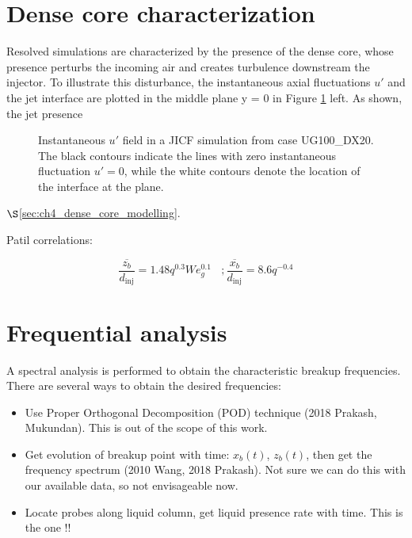 \section{Dense core characterization}
\label{subsec:ch5_dense_core_in_ACLS_simus}

Resolved simulations are characterized by the presence of the dense core, whose presence perturbs the incoming air and creates turbulence downstream the injector. To illustrate this disturbance, the instantaneous axial fluctuations $u'$ and the jet interface are plotted in the middle plane y = 0 in Figure \ref{fig:results_dense_core_modeling_up_field} left. As shown, the jet presence

\begin{figure}[ht]
\centering
{}
\caption[Perturbation effect of the liquid dense core in the gaseous field.]{Instantaneous $u'$ field in a JICF simulation from case UG100\_DX20. The black contours indicate the lines with zero instantaneous fluctuation $u' = 0$, while the white contours denote the location of the interface at the plane.}
\label{fig:results_dense_core_modeling_up_field}
\end{figure}



$\S$\ref{sec:ch4_dense_core_modelling}.

Patil correlations:

\begin{equation}
\frac{\overline{z_b}}{d_\mathrm{inj}} = 1.48 q^{0.3} We_g^{0.1} ~~~~; \frac{\overline{x_b}}{d_\mathrm{inj}} = 8.6 q^{-0.4}
\end{equation}

\section{Frequential analysis}

A spectral analysis is performed to obtain the characteristic breakup frequencies. There are several ways to obtain the desired frequencies:

\begin{itemize}

	\item Use Proper Orthogonal Decomposition (POD) technique (2018 Prakash, Mukundan). This is out of the scope of this work.
	
	\item Get evolution of breakup point with time: $x_b \left( t \right)$, $z_b \left( t \right)$, then get the frequency spectrum  (2010 Wang, 2018 Prakash). Not sure we can do this with our available data, so not envisageable now.
	
	\item Locate probes along liquid column, get liquid presence rate with time. This is the one !!

\end{itemize}

